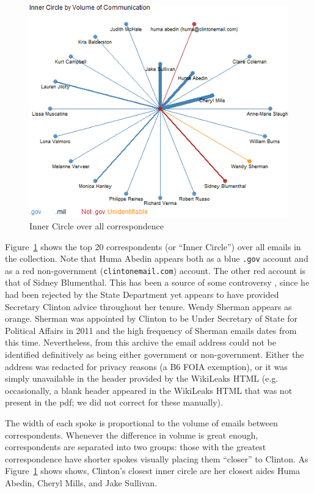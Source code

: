 \documentclass[journal]{vgtc}                %
\begin{document}
\begin{figure}[h]
\begin{center}
\includegraphics[width=0.95\linewidth]{SpiralNetworkFullTime}
\caption{Inner Circle over all correspondence}
\label{fig:InnerCircleAll}
\end{center}
\end{figure}
Figure~\ref{fig:InnerCircleAll} shows the top 20 correspondents (or ``Inner Circle'')  over all emails in the collection.
Note that Huma Abedin appears both as a blue  \texttt{.gov} account and as a red non-government (\texttt{clintonemail.com}) account.   The other red account is that of Sidney Blumenthal.  This has been a source of some controversy  \cite{BlumenthalControversy, NYTBlumenthalBenghazi}, since he had been rejected by the State Department yet appears to have provided Secretary Clinton advice throughout her tenure.  Wendy Sherman appears as orange. Sherman was appointed by Clinton to be Under Secretary of State for Political Affairs in 2011 and the high frequency of Sherman emails dates from this time.  Nevertheless, from this archive the email address could not be identified definitively as being either government or non-government.  Either the address was redacted for privacy reasons (a B6 FOIA exemption), or it was simply unavailable in the header provided by the WikiLeaks HTML \cite{WikileaksPull} (e.g. occasionally, a blank header appeared in the WikiLeaks HTML that was not present in the pdf; we did not correct for these manually).

The width of each spoke is proportional to the volume of emails between correspondents.  Whenever the difference in volume is great enough,  correspondents are separated into two groups: those with the greatest correspondence have shorter spokes visually placing them ``closer'' to Clinton.  As Figure~\ref{fig:InnerCircleAll} shows shows, Clinton's closest inner circle are her closest aides Huma Abedin, Cheryl Mills, and Jake Sullivan.
\end{document}
